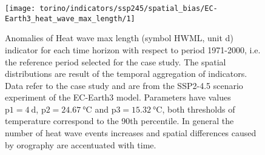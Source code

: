 \begin{figure}
  \centering
  \texttt{[image: torino/indicators/ssp245/spatial\_bias/EC-Earth3\_heat\_wave\_max\_length/1]}
  \caption{Anomalies of {Heat wave max length} (symbol $\mathrm{HWML}$, unit \unit{\day}) indicator for each time horizon with respect to period 1971-2000, i.e. the reference period selected for the case study. The spatial distributions are result of the temporal aggregation of indicators. Data refer to the case study and are from the SSP2-4.5 scenario experiment of the EC-Earth3 model. Parameters have values $\mathrm{p1} = \qty{4}{\day}$, $\mathrm{p2} = \qty{24.67}{\degreeCelsius}$ and $\mathrm{p3} = \qty{15.32}{\degreeCelsius}$, both thresholds of temperature correspond to the 90th percentile. In general the number of heat wave events increases and spatial differences caused by orography are accentuated with time.}
  \label{fig:spatial_bias_EC-Earth3_heat_wave_max_length}
\end{figure}



